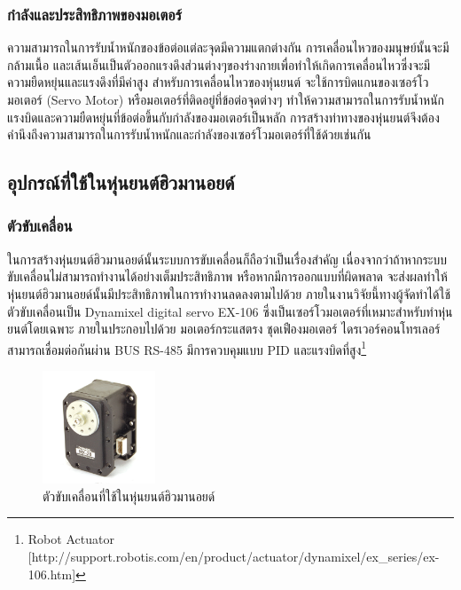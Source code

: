 \subsubsection{กำลังและประสิทธิภาพของมอเตอร์}
ความสามารถในการรับน้ำหนักของข้อต่อแต่ละจุดมีความแตกต่างกัน การเคลื่อนไหวของมนุษย์นั้นจะมีกล้ามเนื้อ
และเส้นเอ็นเป็นตัวออกแรงดึงส่วนต่างๆของร่างกายเพื่อทำให้เกิดการเคลื่อนไหวซึ่งจะมีความยืดหยุ่นและแรงดึงที่มีค่าสูง
สำหรับการเคลื่อนไหวของหุ่นยนต์ จะใช้การบิดแกนของเซอร์โวมอเตอร์ (Servo Motor) หรือมอเตอร์ที่ติดอยู่ที่ข้อต่อจุดต่างๆ
ทำให้ความสามารถในการรับน้ำหนัก แรงบิดและความยืดหยุ่นที่ข้อต่อขึ้นกับกำลังของมอเตอร์เป็นหลัก
การสร้างท่าทางของหุ่นยนต์จึงต้องคำนึงถึงความสามารถในการรับน้ำหนักและกำลังของเซอร์โวมอเตอร์ที่ใช้ด้วยเช่นกัน


\subsection{อุปกรณ์ที่ใช้ในหุ่นยนต์ฮิวมานอยด์}

\subsubsection*{ตัวขับเคลื่อน}
ในการสร้างหุ่นยนต์ฮิวมานอยด์นั้นระบบการขับเคลื่อนก็ถือว่าเป็นเรื่องสำคัญ เนื่องจากว่าถ้าหากระบบขับเคลื่อนไม่สามารถทำงานได้อย่างเต็มประสิทธิภาพ
หรือหากมีการออกแบบที่ผิดพลาด จะส่งผลทำให้หุ่นยนต์ฮิวมานอยด์นั้นมีประสิทธิภาพในการทำงานลดลงตามไปด้วย ภายในงานวิจัยนี้ทางผู้จัดทำได้ใช้ตัวขับเคลื่อนเป็น
Dynamixel digital servo EX-106 ซึ่งเป็นเซอร์โวมอเตอร์ที่เหมาะสำหรับทำหุ่นยนต์โดยเฉพาะ ภายในประกอบไปด้วย มอเตอร์กระแสตรง ชุดเฟืองมอเตอร์
ไดรเวอร์คอนโทรเลอร์ สามารถเชื่อมต่อกันผ่าน BUS RS-485 มีการควบคุมแบบ PID และแรงบิดที่สูง\footnote{ Robot Actuator [http://support.robotis.com/en/product/actuator/dynamixel/ex\_series/ex-106.htm] }

\begin{figure}[!ht]
    \centering
    \includegraphics[width=0.3\textwidth]{chapter2/images/actuator_robot.jpg}
    \caption{ตัวขับเคลื่อนที่ใช้ในหุ่นยนต์ฮิวมานอยด์}
    \label{fig:actuator_robot}
\end{figure}

